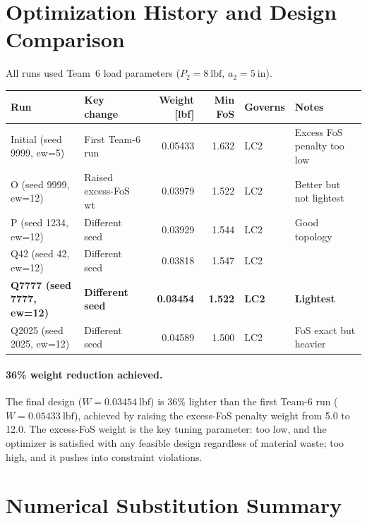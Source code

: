 \documentclass[11pt,letterpaper]{article}
\begin{document}
\section{Optimization History and Design Comparison}
\label{sec:history}

All runs used Team~6 load parameters ($P_2 = 8\ \mathrm{lbf}$, $a_2 = 5\ \mathrm{in}$).

\begin{center}
\begin{tabular}{llrrll}
\toprule
Run & Key change & Weight [lbf] & Min FoS & Governs & Notes \\
\midrule
Initial (seed 9999, ew=5) & First Team-6 run & 0.05433 & 1.632 & LC2 & Excess FoS penalty too low \\
O (seed 9999, ew=12) & Raised excess-FoS wt & 0.03979 & 1.522 & LC2 & Better but not lightest \\
P (seed 1234, ew=12) & Different seed       & 0.03929 & 1.544 & LC2 & Good topology \\
Q42 (seed 42, ew=12) & Different seed       & 0.03818 & 1.547 & LC2 & \\
\textbf{Q7777 (seed 7777, ew=12)} & \textbf{Different seed} & \textbf{0.03454} & \textbf{1.522} & \textbf{LC2} & \textbf{Lightest} \\
Q2025 (seed 2025, ew=12) & Different seed   & 0.04589 & 1.500 & LC2 & FoS exact but heavier \\
\bottomrule
\end{tabular}
\end{center}

\paragraph{36\% weight reduction achieved.}
The final design ($W = 0.03454\ \mathrm{lbf}$) is 36\% lighter than the first
Team-6 run ($W = 0.05433\ \mathrm{lbf}$), achieved by raising the excess-FoS
penalty weight from 5.0 to 12.0.  The excess-FoS weight is the key tuning
parameter: too low, and the optimizer is satisfied with any feasible design
regardless of material waste; too high, and it pushes into constraint
violations.


\section{Numerical Substitution Summary}
\label{sec:substitution}
\end{document}
